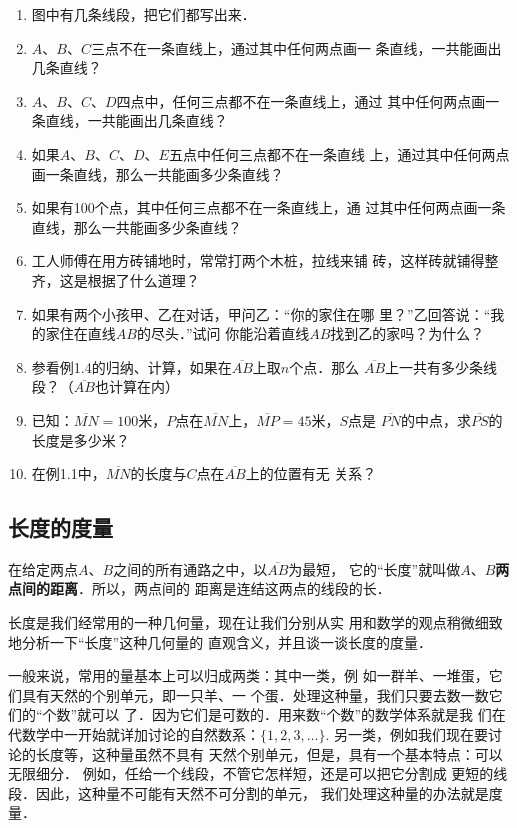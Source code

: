 \begin{ex}
\begin{enumerate}
	\item 图中有几条线段，把它们都写出来．
	\item $A$、$B$、$C$三点不在一条直线上，通过其中任何两点画一
	条直线，一共能画出几条直线？
	\item $A$、$B$、$C$、$D$四点中，任何三点都不在一条直线上，通过
	其中任何两点画一条直线，一共能画出几条直线？
	\item 如果$A$、$B$、$C$、$D$、$E$五点中任何三点都不在一条直线
上，通过其中任何两点画一条直线，那么一共能画多少条直线？
	\item 如果有100个点，其中任何三点都不在一条直线上，通
	过其中任何两点画一条直线，那么一共能画多少条直线？
	\item 工人师傅在用方砖铺地时，常常打两个木桩，拉线来铺
	砖，这样砖就铺得整齐，这是根据了什么道理？
\item 如果有两个小孩甲、乙在对话，甲问乙：“你的家住在哪
里？”乙回答说：“我的家住在直线$AB$的尽头．”试问
你能沿着直线$AB$找到乙的家吗？为什么？
\item 参看例1.4的归纳、计算，如果在$\overline{AB}$上取$n$个点．那么
$\overline{AB}$上一共有多少条线段？（$\overline{AB}$也计算在内）
\item 已知：$\overline{MN}=100$米，$P$点在$\overline{MN}$上，$\overline{MP}=45$米，$S$点是
$\overline{PN}$的中点，求$\overline{PS}$的长度是多少米？
\item 在例1.1中，$\overline{MN}$的长度与$C$点在$\overline{AB}$上的位置有无
关系？
\end{enumerate}
\end{ex}


\subsection{长度的度量}
在给定两点$A$、$B$之间的所有通路之中，以$\overline{AB}$为最短，
它的“长度”就叫做$A$、$B$\textbf{两点间的距离}．所以，两点间的
距离是连结这两点的线段的长．

长度是我们经常用的一种几何量，现在让我们分别从实
用和数学的观点稍微细致地分析一下“长度”这种几何量的
直观含义，并且谈一谈长度的度量．

一般来说，常用的量基本上可以归成两类：其中一类，例
如一群羊、一堆蛋，它们具有天然的个别单元，即一只羊、一
个蛋．处理这种量，我们只要去数一数它们的“个数”就可以
了．因为它们是可数的．用来数“个数”的数学体系就是我
们在代数学中一开始就详加讨论的自然数系：$\{1,2,3,\ldots\}$. 另一类，例如我们现在要讨论的长度等，这种量虽然不具有
天然个别单元，但是，具有一个基本特点：可以无限细分．
例如，任给一个线段，不管它怎样短，还是可以把它分割成
更短的线段．因此，这种量不可能有天然不可分割的单元，
我们处理这种量的办法就是度量．

